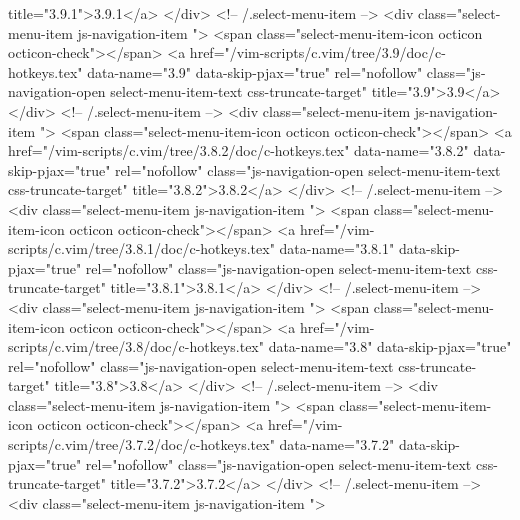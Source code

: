                  title="3.9.1">3.9.1</a>
            </div> <!-- /.select-menu-item -->
            <div class="select-menu-item js-navigation-item ">
              <span class="select-menu-item-icon octicon octicon-check"></span>
              <a href="/vim-scripts/c.vim/tree/3.9/doc/c-hotkeys.tex"
                 data-name="3.9"
                 data-skip-pjax="true"
                 rel="nofollow"
                 class="js-navigation-open select-menu-item-text css-truncate-target"
                 title="3.9">3.9</a>
            </div> <!-- /.select-menu-item -->
            <div class="select-menu-item js-navigation-item ">
              <span class="select-menu-item-icon octicon octicon-check"></span>
              <a href="/vim-scripts/c.vim/tree/3.8.2/doc/c-hotkeys.tex"
                 data-name="3.8.2"
                 data-skip-pjax="true"
                 rel="nofollow"
                 class="js-navigation-open select-menu-item-text css-truncate-target"
                 title="3.8.2">3.8.2</a>
            </div> <!-- /.select-menu-item -->
            <div class="select-menu-item js-navigation-item ">
              <span class="select-menu-item-icon octicon octicon-check"></span>
              <a href="/vim-scripts/c.vim/tree/3.8.1/doc/c-hotkeys.tex"
                 data-name="3.8.1"
                 data-skip-pjax="true"
                 rel="nofollow"
                 class="js-navigation-open select-menu-item-text css-truncate-target"
                 title="3.8.1">3.8.1</a>
            </div> <!-- /.select-menu-item -->
            <div class="select-menu-item js-navigation-item ">
              <span class="select-menu-item-icon octicon octicon-check"></span>
              <a href="/vim-scripts/c.vim/tree/3.8/doc/c-hotkeys.tex"
                 data-name="3.8"
                 data-skip-pjax="true"
                 rel="nofollow"
                 class="js-navigation-open select-menu-item-text css-truncate-target"
                 title="3.8">3.8</a>
            </div> <!-- /.select-menu-item -->
            <div class="select-menu-item js-navigation-item ">
              <span class="select-menu-item-icon octicon octicon-check"></span>
              <a href="/vim-scripts/c.vim/tree/3.7.2/doc/c-hotkeys.tex"
                 data-name="3.7.2"
                 data-skip-pjax="true"
                 rel="nofollow"
                 class="js-navigation-open select-menu-item-text css-truncate-target"
                 title="3.7.2">3.7.2</a>
            </div> <!-- /.select-menu-item -->
            <div class="select-menu-item js-navigation-item ">
